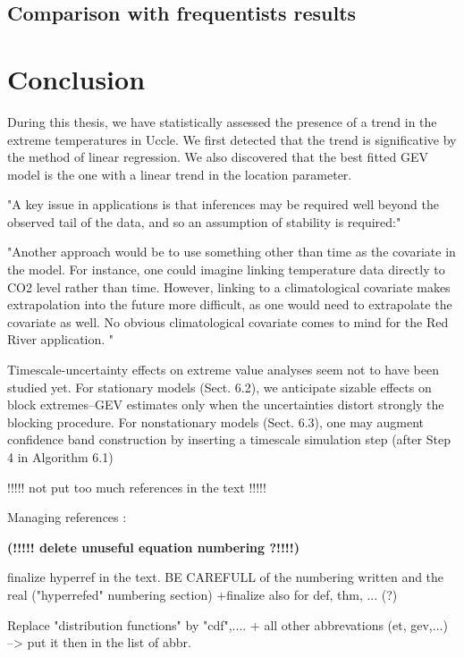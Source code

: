 \documentclass[11pt,a4paper,openany ]{book}
\begin{document}
\section{Comparison with frequentists results}



\chapter{Conclusion}
\thispagestyle{empty}

During this thesis, we have statistically assessed the presence of a trend in the extreme temperatures in Uccle. We first detected that the trend is significative by the method of linear regression. We also discovered that the best fitted GEV model is the one with a linear trend in the location parameter.

"A key issue in applications is that inferences
may be required well beyond the observed tail of
the data, and so an assumption of stability is required:" \cite{davison_statistical_2012}

"Another approach would be to use something other than time as the covariate 
in the model. For instance, one could imagine linking temperature data directly to
CO2 level rather than time. However, linking to a climatological covariate makes
extrapolation into the future more difficult, as one would need to extrapolate the 
covariate as well. No obvious climatological covariate comes to mind for the Red
River application. " %


Timescale-uncertainty effects on extreme value analyses seem not to have been
studied yet. For stationary models (Sect. 6.2), we anticipate sizable effects on block
extremes–GEV estimates only when the uncertainties distort strongly the blocking
procedure. For nonstationary models (Sect. 6.3), one may augment confidence band
construction by inserting a timescale simulation step (after Step 4 in Algorithm 6.1) \citet[pp.262]{mudelsee_climate_2014}

!!!!! not put too much references in the text !!!!!

Managing references : 

\textbf{(!!!!! delete unuseful equation numbering ?!!!!)}

finalize hyperref in the text. BE CAREFULL of the numbering written and the real ("hyperrefed" numbering section)
+finalize also for def, thm, ... (?)

Replace "distribution functions" by "cdf",....  + all other abbrevations (et, gev,...) --> put it then in the list of abbr.
\end{document}

